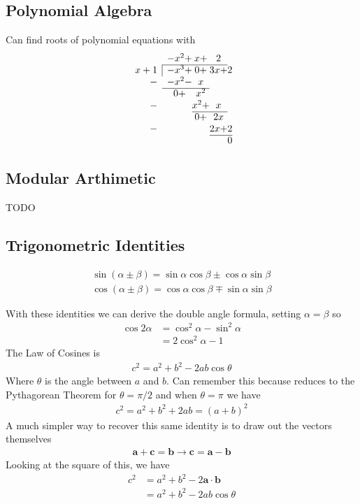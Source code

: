 \subsection{Polynomial Algebra}

Can find roots of polynomial equations with
$$
\begin{array}{rc@{}c@{}c@{}c@{}}
& -x^2 +& x + &2 & \\ \cline{2-4}
\multicolumn{1}{r|}{x+1} &-x^3+ & 0 + & 3x +&2\\
-&-x^2 -&x  &\\ \cline{2-3}
& 0 +& x^2 &\\ 
-&  & x^2 +&x\\ \cline{3-4}
& & 0 +&2x &\\ 
-& &  &2x +&2\\ \cline{4-5}
& & & &0\\
\end{array}
$$

\subsection{Modular Arthimetic}
TODO

\subsection{Trigonometric Identities}

\begin{align}
\sin(\alpha\pm\beta) = \sin\alpha\cos\beta\pm\cos\alpha\sin\beta\\
\cos(\alpha\pm\beta) = \cos\alpha\cos\beta\mp\sin\alpha\sin\beta
\end{align}

With these identities we can derive the double angle formula, setting $\alpha = \beta$ so
\begin{align}
\cos2\alpha &= \cos^2\alpha -\sin^2\alpha\\
&= 2\cos^2\alpha-1
\end{align}
The Law of Cosines is 
\begin{align}
c^2 = a^2 + b^2 -2ab\cos\theta
\end{align}
Where $\theta$ is the angle between $a$ and $b$. Can remember this because reduces to the Pythagorean Theorem for $\theta = \pi/2$ and when $\theta = \pi$ we have
\begin{align}
c^2 = a^2 + b^2 +2ab = (a+b)^2
\end{align}
A much simpler way to recover this same identity is to draw out the vectors themselves
\begin{align}
	\textbf{a} + \textbf{c} = \textbf{b} \rightarrow \textbf{c} = \textbf{a} - \textbf{b}
\end{align}
Looking at the square of this, we have
\begin{align}
	c^2 &= a^2 + b^2 - 2\textbf{a}\cdot\textbf{b}\\
	&= a^2 + b^2 -2ab\cos\theta 
\end{align}

